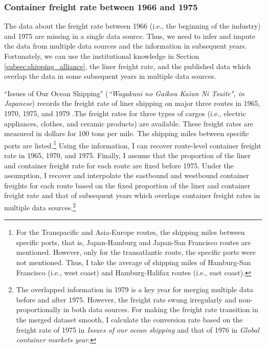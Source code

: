 \subsubsection{Container freight rate between 1966 and 1975}



The data about the freight rate between 1966 (i.e., the beginning of the industry) and 1975 are missing in a single data source. Thus, we need to infer and impute the data from multiple data sources and the information in subsequent years. Fortunately, we can use the institutional knowledge in Section \ref{subsec:shipping_alliance}, the liner freight rate, and the published data which overlap the data in some subsequent years in multiple data sources.

``Issues of Our Ocean Shipping" (\textit{``Wagakuni no Gaikou Kaiun Ni Tsuite", in Japanese}) records the freight rate of liner shipping on major three routes in 1965, 1970, 1975, and 1979 .The freight rates for three types of cargos (i.e., electric appliances, clothes, and ceramic products) are available. These freight rates are measured in dollars for 100 tons per mile. The shipping miles between specific ports are listed.\footnote{For the Transpacific and Asia-Europe routes, the shipping miles between specific ports, that is, Japan-Hamburg and Japan-San Francisco routes are mentioned. However, only for the transatlantic route, the specific ports were not mentioned. Thus, I take the average of shipping miles of Hamburg-San Francisco (i.e., west coast) and Hamburg-Halifax routes (i.e., east coast).} Using the information, I can recover route-level container freight rate in 1965, 1970, and 1975. Finally, I assume that the proportion of the liner and container freight rate for each route are fixed before 1975. Under the assumption, I recover and interpolate the eastbound and westbound container freights for each route based on the fixed proportion of the liner and container freight rate and that of subsequent years which overlaps container freight rates in multiple data sources.\footnote{The overlapped information in 1979 is a key year for merging multiple data before and after 1975. However, the freight rate swung irregularly and non-proportionally in both data sources. For making the freight rate transition in the merged dataset smooth, I calculate the conversion rate based on the freight rate of 1975 in \textit{Issues of our ocean shipping} and that of 1976 in \textit{Global container markets year}.}



